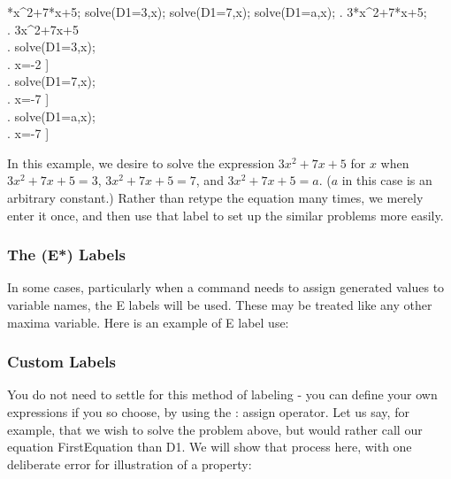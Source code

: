 \vspace{3ex}

\label{Line Labels (Example 4)}

*x^2+7*x+5;
solve(D1=3,x);
solve(D1=7,x);
solve(D1=a,x);
\maximatexsession
{}.  3*x^2+7*x+5; \\
.   3\*x^{2}+7\*x+5 \\
.  solve(D1=3,x); \\
.   \left[ x=-{{1}\over{3}},\linebreak[0]x=-2 \right]  \\
.  solve(D1=7,x); \\
.   \left[ x=-{{\sqrt{73}+7}\over{6}},\linebreak[0]x={{-7
 }} \right]  \\
.  solve(D1=a,x); \\
.   \left[ x=-{{\sqrt{12\*a-11}+7}\over{6}},\linebreak[0]x={{-7}} \right]  \\
\endmaximasession

\vspace{3ex}

In this example, we desire to solve the expression \( 3x^{2}+7x+5 \)
for \( x \) when \( 3x^{2}+7x+5=3 \), \( 3x^{2}+7x+5=7 \), and
\( 3x^{2}+7x+5=a \). (\( a \) in this case is an arbitrary constant.)
Rather than retype the equation many times, we merely enter it once,
and then use that label to set up the similar problems more easily.

\subsubsection{The (E{*}) Labels}

In some cases, particularly when a command needs to assign generated values
to variable names, the E labels will be used.  These may be treated like any
other maxima variable.  Here is an example of E label use:

\subsubsection{Custom Labels}

You do not need to settle for this method of labeling - you can define
your own expressions if you so choose, by using the : assign operator.
Let us say, for example, that we wish to solve the problem above,
but would rather call our equation FirstEquation than D1. We will
show that process here, with one deliberate error for illustration
of a property:

